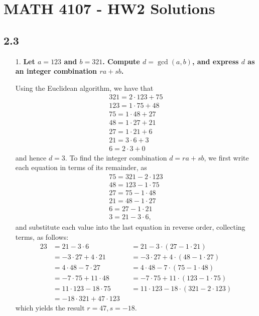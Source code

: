 \documentclass[a4paper,12pt]{article}
\begin{document}
\section*{MATH 4107 - HW2 Solutions}

\subsection*{2.3}
\begin{enumerate}
    \item[1.]
        \boldmath
        \textbf{Let $a = 123$ and $b = 321$. Compute $d = \gcd(a, b)$, and express $d$ as an integer combination $ra + sb$.} \par
        \unboldmath
        Using the Euclidean algorithm, we have that
        \begin{gather*}
            321 = 2 \cdot 123 + 75 \\
            123 = 1 \cdot 75 + 48 \\
            75 = 1 \cdot 48 + 27 \\
            48 = 1 \cdot 27 + 21 \\
            27 = 1 \cdot 21 + 6 \\
            21 = 3 \cdot 6 + 3 \\
            6 = 2 \cdot 3 + 0
        \end{gather*}
        and hence $d = 3$. To find the integer combination $d = ra + sb$, we first write each equation in terms of its remainder, as
        \begin{gather*}
            75 = 321 - 2 \cdot 123 \\
            48 = 123 - 1 \cdot 75 \\
            27 = 75 - 1 \cdot 48 \\
            21 = 48 - 1 \cdot 27 \\
            6 = 27 - 1 \cdot 21 \\
            3 = 21 - 3 \cdot 6,
        \end{gather*}
        and substitute each value into the last equation in reverse order, collecting terms, as follows:
        \begin{alignat*}{2}
            3 &= 21 - 3 \cdot 6          &&= 21 - 3 \cdot (27 - 1 \cdot 21) \\
            &= -3 \cdot 27 + 4 \cdot 21  &&= -3 \cdot 27 + 4 \cdot (48 - 1 \cdot 27) \\
            &= 4 \cdot 48 - 7 \cdot 27   &&= 4 \cdot 48 - 7 \cdot (75 - 1 \cdot 48) \\
            &= -7 \cdot 75 + 11 \cdot 48  &&= -7 \cdot 75 + 11 \cdot (123 - 1 \cdot 75) \\
            &= 11 \cdot 123 - 18 \cdot 75 &&= 11 \cdot 123 - 18 \cdot (321 - 2 \cdot 123) \\
            &= -18 \cdot 321 + 47 \cdot 123
        \end{alignat*}
        which yields the result $r = 47, s = -18$.
 

\end{enumerate}
\end{document}
